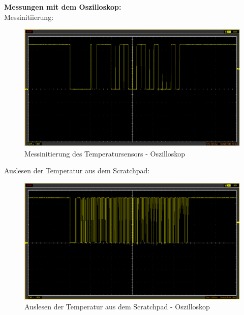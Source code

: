 \documentclass[12pt,a4paper]{article}
\begin{document}
\pagebreak

\textbf{Messungen mit dem Oszilloskop:} \\
Messinitiierung:
\begin{figure}[H]
	\centering
	\includegraphics[width=0.9\linewidth]{Messinitialisierung_1wire_Oszi}
	\caption{Messinitierung des Temperatursensors - Oszilloskop}
	\label{figure:Messinitialisierung_1wire_Oszi}
\end{figure}

Auslesen der Temperatur aus dem Scratchpad:
\begin{figure}[H]
	\centering
	\includegraphics[width=1\linewidth]{scratchpad_1wire_Oszi}
	\caption{Auslesen der Temperatur aus dem Scratchpad - Oszilloskop}
	\label{figure:scratchpad_1wire_Oszi}
\end{figure}

\pagebreak
\end{document}
